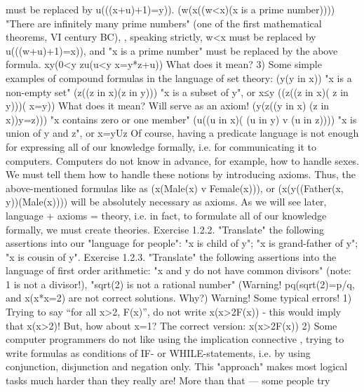                                                 must be replaced by \exists u(((x+u)+1)=y)).
(\forall w(\exists x((w<x)\AND (x is a prime number)))) "There are infinitely many prime numbers" (one
                                         of the first mathematical theorems, VI century
                                        BC), , speaking strictly, w<x must be replaced by
                                       \exists u(((w+u)+1)=x)), and "x is a prime number"
                                        must be replaced by the above formula.
\forall x\forall y(0<y \IMPLIES  \exists z\exists u(u<y \AND  x=y*z+u)) What does it mean?
3) Some simple examples of compound formulas in the language of set theory:
(\exists y(y in x)) "x is a non-empty set"
(\forall z((z in x)\IMPLIES (z in y))) "x is a subset of y", or x≤y
((\forall z((z in x)\IFF ( z in y)))\IMPLIES ( x=y)) What does it mean? Will serve as an axiom!
(\forall y(\forall z((y in x) \AND  (z in x))\IMPLIES y=z))) "x contains zero or one member"
(\forall u((u in x)\IFF ( (u in y) v (u in z)))) "x is union of y and z", or x=yUz
Of course, having a predicate language is not enough for expressing all of our knowledge formally, i.e.
for communicating it to computers. Computers do not know in advance, for example, how to handle
sexes. We must tell them how to handle these notions by introducing axioms. Thus, the above-mentioned
formulas like as (\forall x(Male(x) v Female(x))), or (\forall x(\forall y((Father(x, y))\IMPLIES (Male(x)))) will be absolutely
necessary as axioms. As we will see later, language + axioms = theory, i.e. in fact, to formulate all of our
knowledge formally, we must create theories.
Exercise 1.2.2. "Translate" the following assertions into our "language for people":
"x is child of y";
"x is grand-father of y";
"x is cousin of y".
Exercise 1.2.3. "Translate" the following assertions into the language of first order arithmetic:
"x and y do not have common divisors" (note: 1 is not a divisor!),
"sqrt(2) is not a rational number"
(Warning! \neg \exists p\exists q(sqrt(2)=p/q, and \exists x(x*x=2) are not correct solutions. Why?)
Warning! Some typical errors!
1) Trying to say ``for all x>2, F(x)'', do not write \forall x(x>2\AND F(x)) - this would imply that \forall x(x>2)! But,
how about x=1? The correct version: \forall x(x>2\IMPLIES F(x))
2) Some computer programmers do not like using the implication connective \IMPLIES , trying to write formulas
as conditions of IF- or WHILE-statements, i.e. by using conjunction, disjunction and negation only. This
"approach" makes most logical tasks much harder than they really are! More than that --- some people try
